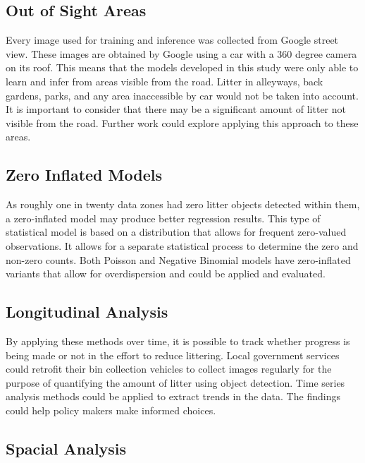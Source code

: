 \documentclass{thesis}
\begin{document}
\subsection{Out of Sight Areas}

Every image used for training and inference was collected from Google street view. These images are obtained by Google using a car with a 360 degree camera on its roof. This means that the models developed in this study were only able to learn and infer from areas visible from the road. Litter in alleyways, back gardens, parks, and any area inaccessible by car would not be taken into account. It is important to consider that there may be a significant amount of litter not visible from the road. Further work could explore applying this approach to these areas.

\subsection{Zero Inflated Models}

As roughly one in twenty data zones had zero litter objects detected within them, a zero-inflated model may produce better regression results. This type of statistical model is based on a distribution that allows for frequent zero-valued observations. It allows for a separate statistical process to determine the zero and non-zero counts. Both Poisson and Negative Binomial models have zero-inflated variants that allow for overdispersion and could be applied and evaluated.

\subsection{Longitudinal Analysis}

By applying these methods over time, it is possible to track whether progress is being made or not in the effort to reduce littering. Local government services could retrofit their bin collection vehicles to collect images regularly for the purpose of quantifying the amount of litter using object detection. Time series analysis methods could be applied to extract trends in the data. The findings could help policy makers make informed choices.

\subsection{Spacial Analysis}
\end{document}
